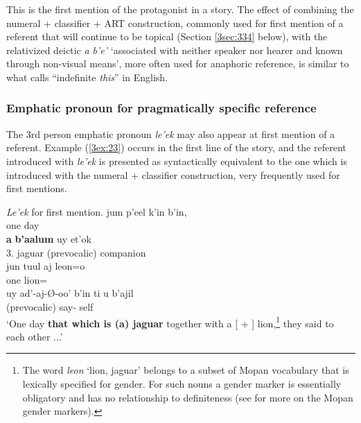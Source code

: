 \documentclass[output=paper]{langsci/langscibook}
\begin{document}
This is the first mention of the protagonist in a story.  The effect of combining the numeral + classifier + ART construction, commonly used for first mention of a referent that will continue to be topical (Section \ref{3sec:334} below), with the relativized deictic {\emph{a b'e'}} `associated with neither speaker nor hearer and known through non-visual means', more often used for anaphoric reference, is similar to what \cite{prince:81} calls ``indefinite {\emph{this}}'' in English.

\subsubsection{Emphatic pronoun for pragmatically specific reference}\label{3sec:333}

The 3rd person emphatic pronoun {\emph{le'ek}} may also appear at first mention of a referent. Example (\ref{3ex:23}) occurs in the first line of the story, and the referent introduced with {\emph{le'ek}} is presented as syntactically equivalent to the one which is introduced with the numeral + classifier construction, very frequently used for first mentions.

\filbreak
\begin{exe}
\ex\label{3ex:23}
{\emph{Le'ek}} for first mention.  
\exi{}
\gll	jum	p'eel 		k'in 	b'in, \\
	one	{}	day	{}	\\
\glt
\exi{}
 	{\bf{a}} 	{\bf{b'aalum}} 	uy				et'ok \\
	3.{}	{}		jaguar		{}(prevocalic)	companion \\
\glt
\exi{}
\gll	jun 	tuul 			aj 			leon=o \\
	one	{}	{}	lion={} \\
\glt 
\exi{}
\gll	uy				ad'-aj-\O-oo'	 			b'in 	ti	 		u	 	b’ajil \\
	{}(prevocalic)	say-{}	{}	{}		{}	self \\
\glt `One day {\bf{that which is (a) jaguar}} together with a [{} + {}] lion,\footnote{The word {\emph{leon}} `lion, jaguar' belongs to a subset of Mopan vocabulary that is lexically specified for gender.  For such nouns a gender marker is essentially obligatory and has no relationship to definiteness (see \citealt{contini:morava:danziger:18} for more on the Mopan gender markers).} they said to each other ...'
\end{exe}
\end{document}

